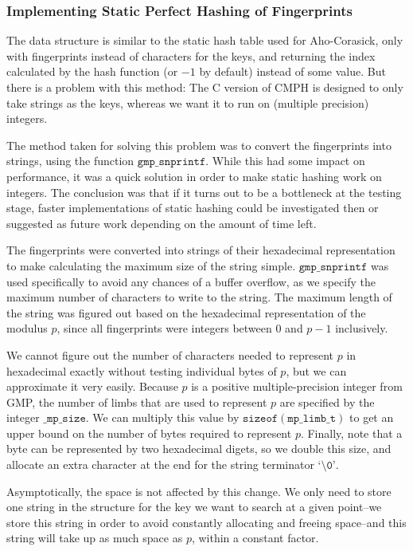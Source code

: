 \documentclass[ %
                    author={Dominic Joseph Moylett},
                    degree={MEng},
                     title={Dictionary Matching with Fingerprints},
                  subtitle={An Empirical Analysis},
                      type={Research},
                      year={2014} ]{dissertation}
\begin{document}
\subsubsection{Implementing Static Perfect Hashing of Fingerprints}
\label{sssec:static-hashing-kr}

The data structure is similar to the static hash table used for Aho-Corasick, only with fingerprints instead of characters for the keys, and returning the index calculated by the hash function (or $-1$ by default) instead of some value. But there is a problem with this method: The C version of CMPH is designed to only take strings as the keys, whereas we want it to run on (multiple precision) integers.

The method taken for solving this problem was to convert the fingerprints into strings, using the function $\texttt{gmp\_snprintf}$. While this had some impact on performance, it was a quick solution in order to make static hashing work on integers. The conclusion was that if it turns out to be a bottleneck at the testing stage, faster implementations of static hashing could be investigated then or suggested as future work depending on the amount of time left.

The fingerprints were converted into strings of their hexadecimal representation to make calculating the maximum size of the string simple. $\texttt{gmp\_snprintf}$ was used specifically to avoid any chances of a buffer overflow, as we specify the maximum number of characters to write to the string. The maximum length of the string was figured out based on the hexadecimal representation of the modulus $p$, since all fingerprints were integers between 0 and $p - 1$ inclusively.

We cannot figure out the number of characters needed to represent $p$ in hexadecimal exactly without testing individual bytes of $p$, but we can approximate it very easily. Because $p$ is a positive multiple-precision integer from GMP, the number of limbs that are used to represent $p$ are specified by the integer $\texttt{\_mp\_size}$. We can multiply this value by $\texttt{sizeof}(\texttt{mp\_limb\_t})$ to get an upper bound on the number of bytes required to represent $p$. Finally, note that a byte can be represented by two hexadecimal digets, so we double this size, and allocate an extra character at the end for the string terminator $\texttt{`\textbackslash0'}$.

Asymptotically, the space is not affected by this change. We only need to store one string in the structure for the key we want to search at a given point--we store this string in order to avoid constantly allocating and freeing space--and this string will take up as much space as $p$, within a constant factor.
\end{document}
